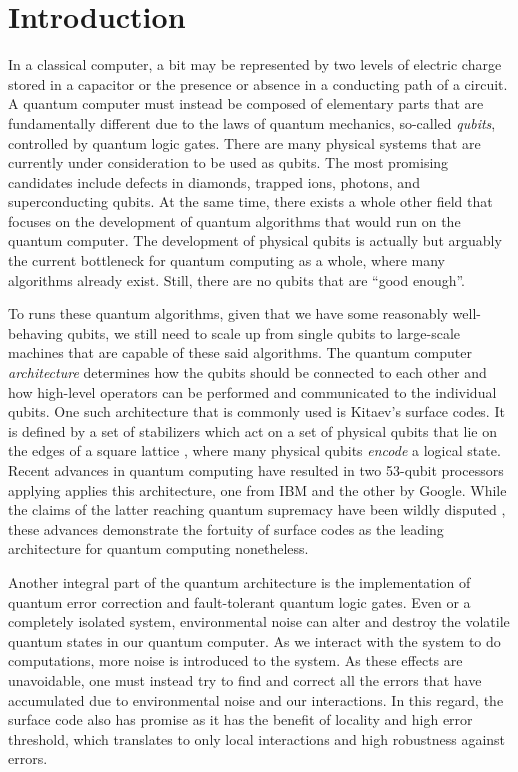 \chapter{Introduction}

In a classical computer, a bit may be represented by two levels of electric charge stored in a capacitor or the presence or absence in a conducting path of a circuit. A quantum computer must instead be composed of elementary parts that are fundamentally different due to the laws of quantum mechanics, so-called \emph{qubits}, controlled by quantum logic gates. There are many physical systems that are currently under consideration to be used as qubits. The most promising candidates include defects in diamonds, trapped ions, photons, and superconducting qubits. At the same time, there exists a whole other field that focuses on the development of quantum algorithms that would run on the quantum computer. The development of physical qubits is actually but arguably the current bottleneck for quantum computing as a whole, where many algorithms already exist. Still, there are no qubits that are ``good enough''.

To runs these quantum algorithms, given that we have some reasonably well-behaving qubits, we still need to scale up from single qubits to large-scale machines that are capable of these said algorithms. The quantum computer \emph{architecture} determines how the qubits should be connected to each other and how high-level operators can be performed and communicated to the individual qubits. One such architecture that is commonly used is Kitaev's surface codes. It is defined by a set of stabilizers which act on a set of physical qubits that lie on the edges of a square lattice \cite{dennis2002topological}, where many physical qubits \emph{encode} a logical state. Recent advances in quantum computing have resulted in two 53-qubit processors applying applies this architecture, one from IBM and the other by Google. While the claims of the latter reaching quantum supremacy have been wildly disputed \cite{arute2019quantum}, these advances demonstrate the fortuity of surface codes as the leading architecture for quantum computing nonetheless.   

Another integral part of the quantum architecture is the implementation of quantum error correction and fault-tolerant quantum logic gates. Even or a completely isolated system, environmental noise can alter and destroy the volatile quantum states in our quantum computer. As we interact with the system to do computations, more noise is introduced to the system. As these effects are unavoidable, one must instead try to find and correct all the errors that have accumulated due to environmental noise and our interactions. In this regard, the surface code also has promise as it has the benefit of locality and high error threshold, which translates to only local interactions and high robustness against errors. 

